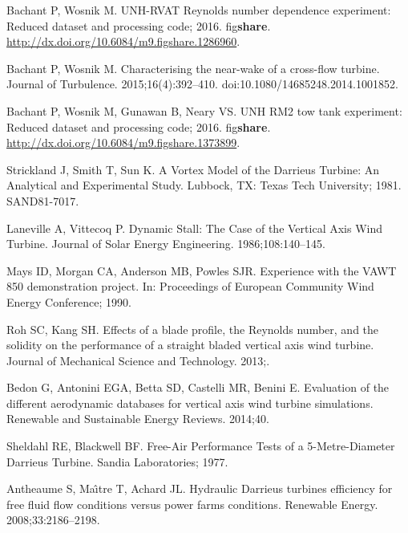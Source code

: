 \documentclass[10pt,letterpaper]{article}
\begin{document}
\begin{thebibliography}{10}
    Bachant P, Wosnik M. {UNH-RVAT} {R}eynolds number dependence experiment:
      Reduced dataset and processing code; 2016.
    \newblock fig\textbf{share}.
      \url{http://dx.doi.org/10.6084/m9.figshare.1286960}.

    Bachant P, Wosnik M.
    \newblock Characterising the near-wake of a cross-flow turbine.
    \newblock Journal of Turbulence. 2015;16(4):392--410.
    \newblock doi:{10.1080/14685248.2014.1001852}.

    Bachant P, Wosnik M, Gunawan B, Neary VS. {UNH} {RM2} tow tank experiment:
      Reduced dataset and processing code; 2016.
    \newblock fig\textbf{share}.
      \url{http://dx.doi.org/10.6084/m9.figshare.1373899}.

    Strickland J, Smith T, Sun K.
    \newblock A Vortex Model of the Darrieus Turbine: An Analytical and
      Experimental Study.
    \newblock Lubbock, {TX}: Texas Tech University; 1981. SAND81-7017.

    Laneville A, Vittecoq P.
    \newblock Dynamic Stall: The Case of the Vertical Axis Wind Turbine.
    \newblock Journal of Solar Energy Engineering. 1986;108:140--145.

    Mays ID, Morgan CA, Anderson MB, Powles SJR.
    \newblock Experience with the {VAWT} 850 demonstration project.
    \newblock In: Proceedings of European Community Wind Energy Conference; 1990.

    Roh SC, Kang SH.
    \newblock Effects of a blade profile, the {R}eynolds number, and the solidity
      on the performance of a straight bladed vertical axis wind turbine.
    \newblock Journal of Mechanical Science and Technology. 2013;.

    Bedon G, Antonini EGA, Betta SD, Castelli MR, Benini E.
    \newblock Evaluation of the different aerodynamic databases for vertical axis
      wind turbine simulations.
    \newblock Renewable and Sustainable Energy Reviews. 2014;40.

    Sheldahl RE, Blackwell BF.
    \newblock Free-Air Performance Tests of a 5-Metre-Diameter Darrieus Turbine.
    \newblock Sandia Laboratories; 1977.

    Antheaume S, Ma{\^\i}tre T, Achard JL.
    \newblock Hydraulic {D}arrieus turbines efficiency for free fluid flow
      conditions versus power farms conditions.
    \newblock Renewable Energy. 2008;33:2186--2198.


\end{thebibliography}
\end{document}
